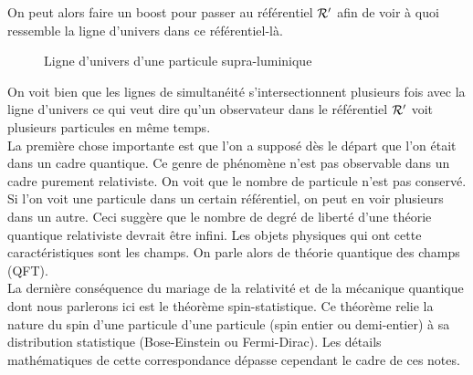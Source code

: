 \documentclass[a4paper,11pt]{report}
\begin{document}
            On peut alors faire un boost pour passer au référentiel $\mathcal{R}'$ afin de voir à quoi ressemble la ligne d'univers dans ce référentiel-là.
            
            \begin{figure}[H]
            \centering
            \label{fig:my_label}
            \caption{Ligne d'univers d'une particule supra-luminique}
            \end{figure}
            
            On voit bien que les lignes de simultanéité s'intersectionnent plusieurs fois avec la ligne d'univers ce qui veut dire qu'un observateur dans le référentiel $\mathcal{R}'$ voit plusieurs particules en même temps.\\
            
            La première chose importante est que l'on a supposé dès le départ que l'on était dans un cadre quantique. Ce genre de phénomène n'est pas observable dans un cadre purement relativiste. On voit que le nombre de particule n'est pas conservé. Si l'on voit une particule dans un certain référentiel, on peut en voir plusieurs dans un autre. Ceci suggère que le nombre de degré de liberté d'une théorie quantique relativiste devrait être infini. Les objets physiques qui ont cette caractéristiques sont les champs. On parle alors de théorie quantique des champs (QFT).\\
            
            La dernière conséquence du mariage de la relativité et de la mécanique quantique dont nous parlerons ici est le théorème spin-statistique. Ce théorème relie la nature du spin d'une particule d'une particule (spin entier ou demi-entier) à sa distribution statistique (Bose-Einstein ou Fermi-Dirac). Les détails mathématiques de cette correspondance dépasse cependant le cadre de ces notes.
\end{document}

